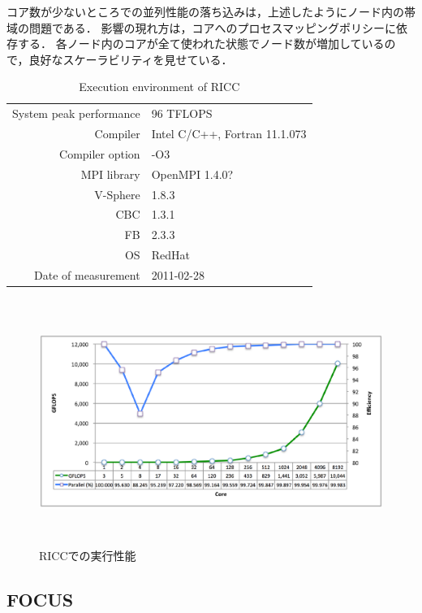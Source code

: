 コア数が少ないところでの並列性能の落ち込みは，上述したようにノード内の帯域の問題である．
影響の現れ方は，コアへのプロセスマッピングポリシーに依存する．
各ノード内のコアが全て使われた状態でノード数が増加しているので，良好なスケーラビリティを見せている．

\begin{table}[htdp]
\caption{Execution environment of RICC}
\small
\begin{center}
\begin{tabular}{rl}\toprule
System peak performance & 96 TFLOPS\\
Compiler & Intel C/C++, Fortran 11.1.073\\
Compiler option & -O3\\
MPI library & OpenMPI 1.4.0?\\
V-Sphere & 1.8.3\\
CBC & 1.3.1\\
FB & 2.3.3\\
OS & RedHat\\
Date of measurement & 2011-02-28\\ \bottomrule
\end{tabular}
\end{center}
\label{tbl:ricc-env}
\end{table}

\begin{figure}[htdp]
\begin{center}
\includegraphics[height=8cm,clip]{ricc.eps}
\end{center}
\caption{RICCでの実行性能}
\label{fig:ricc-perf}
\end{figure}

\pagebreak
%
\subsection{FOCUS}

